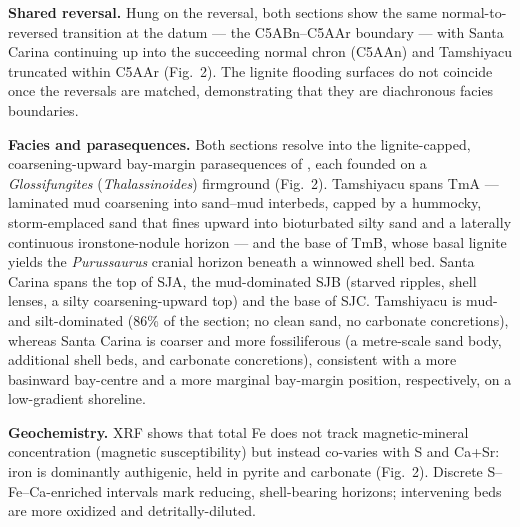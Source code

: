 \documentclass[12pt]{article}
\begin{document}
\textbf{Shared reversal.} Hung on the reversal, both sections show the same
normal-to-reversed transition at the datum --- the C5ABn--C5AAr boundary --- with Santa
Carina continuing up into the succeeding normal chron (C5AAn) and Tamshiyacu truncated
within C5AAr (Fig.~2). The lignite flooding surfaces do not coincide once the reversals are
matched, demonstrating that they are diachronous facies boundaries.

\textbf{Facies and parasequences.} Both sections resolve into the lignite-capped, coarsening-upward
bay-margin parasequences of \citet{Gingras2002}, each founded on a \textit{Glossifungites}
(\textit{Thalassinoides}) firmground (Fig.~2). Tamshiyacu spans TmA --- laminated mud coarsening
into sand--mud interbeds, capped by a hummocky, storm-emplaced sand that fines upward into
bioturbated silty sand and a laterally continuous ironstone-nodule horizon --- and the base of TmB,
whose basal lignite yields the \textit{Purussaurus} cranial horizon beneath a winnowed shell bed. Santa Carina
spans the top of SJA, the mud-dominated SJB (starved ripples, shell lenses, a silty
coarsening-upward top) and the base of SJC. Tamshiyacu is mud- and silt-dominated (86\% of the
section; no clean sand, no carbonate concretions), whereas Santa Carina is coarser and more fossiliferous (a
metre-scale sand body, additional shell beds, and carbonate concretions), consistent with a
more basinward bay-centre and a more marginal bay-margin position, respectively, on a
low-gradient shoreline.

\textbf{Geochemistry.} XRF shows that total Fe does not track magnetic-mineral concentration
(magnetic susceptibility) but instead co-varies with S and Ca+Sr: iron is dominantly
authigenic, held in pyrite and carbonate (Fig.~2). Discrete S--Fe--Ca-enriched intervals
mark reducing, shell-bearing horizons; intervening beds are more oxidized and
detritally-diluted.
\end{document}
